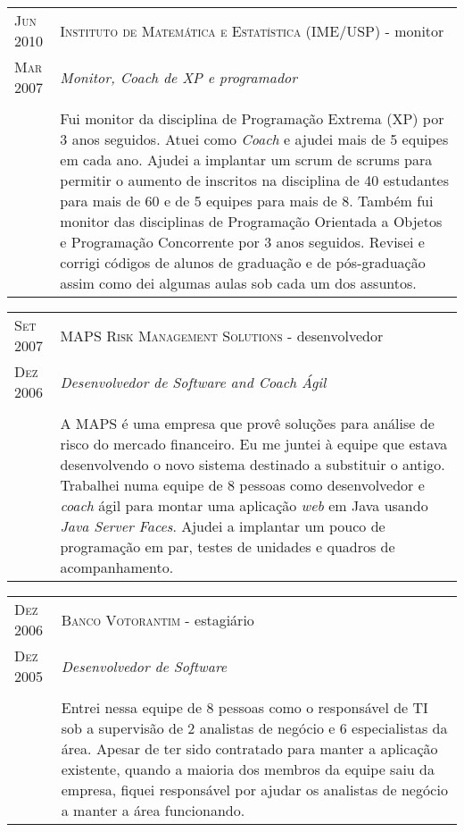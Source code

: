 \documentclass[letter,10pt]{article}
\begin{document}
\begin{tabular}{p{2.5cm}|p{13.5cm}}
  \textsc{Jun 2010} & \textsc{Instituto de Matemática e Estatística
    (IME/USP)} - monitor\\
  \textsc{Mar 2007}& \emph{Monitor, \textit{Coach} de XP e programador}\\
  &\\
  & Fui monitor da disciplina de Programação Extrema (XP) por 3 anos
  seguidos. Atuei como \textit{Coach} e ajudei mais de 5 equipes em
  cada ano. Ajudei a implantar um scrum de scrums para permitir o
  aumento de inscritos na disciplina de 40 estudantes para mais de 60
  e de 5 equipes para mais de 8. Também fui monitor das disciplinas de
  Programação Orientada a Objetos e Programação Concorrente por 3 anos
  seguidos. Revisei e corrigi códigos de alunos de graduação e de
  pós-graduação assim como dei algumas aulas sob cada um dos assuntos.
\end{tabular}

\begin{tabular}{p{2.5cm}|p{13.5cm}}
  \textsc{Set 2007} & \textsc{MAPS Risk
    Management Solutions} - desenvolvedor\\
  \textsc{Dez 2006} &\emph{Desenvolvedor de Software and Coach Ágil}\\
  &\\
  & A MAPS é uma empresa que provê soluções para análise de risco do
  mercado financeiro. Eu me juntei à equipe que estava desenvolvendo o
  novo sistema destinado a substituir o antigo. Trabalhei numa equipe
  de 8 pessoas como desenvolvedor e \textit{coach} ágil para montar
  uma aplicação \textit{web} em Java usando \textit{Java Server
    Faces}. Ajudei a implantar um pouco de programação em par, testes
  de unidades e quadros de acompanhamento.
\end{tabular}

\begin{tabular}{p{2.5cm}|p{13.5cm}}
  \textsc{Dez 2006} & \textsc{Banco Votorantim} - estagiário\\
  \textsc{Dez 2005} &\emph{Desenvolvedor de Software}\\
  &\\
  &Entrei nessa equipe de 8 pessoas como o responsável de TI sob a
  supervisão de 2 analistas de negócio e 6 especialistas da área. Apesar de
  ter sido contratado para manter a aplicação existente, quando a
  maioria dos membros da equipe saiu da empresa, fiquei responsável
  por ajudar os analistas de negócio a manter a área funcionando.
\end{tabular}
\end{document}

